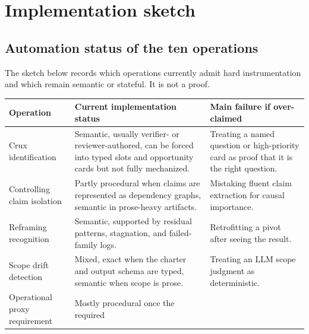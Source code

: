 \documentclass[
  11pt,
]{article}
\begin{document}
\section{Implementation sketch}\label{implementation-sketch}

\subsection{Automation status of the ten
operations}\label{automation-status-of-the-ten-operations}

The sketch below records which operations currently admit hard
instrumentation and which remain semantic or stateful. It is not a proof.

\begin{longtable}[]{@{}
  >{\raggedright\arraybackslash}p{}
  >{\raggedright\arraybackslash}p{}
  >{\raggedright\arraybackslash}p{}@{}}
\toprule\noalign{}
\begin{minipage}[b]{\linewidth}\raggedright
Operation
\end{minipage} & \begin{minipage}[b]{\linewidth}\raggedright
Current implementation status
\end{minipage} & \begin{minipage}[b]{\linewidth}\raggedright
Main failure if over-claimed
\end{minipage} \\
\midrule\noalign{}
\endhead
\bottomrule\noalign{}
\endlastfoot
Crux identification & Semantic, usually verifier- or
reviewer-authored, can be forced into typed slots and opportunity cards
but not fully mechanized. & Treating a named question or high-priority
card as proof that it is the right question. \\
Controlling claim isolation & Partly procedural when claims are
represented as dependency graphs, semantic in prose-heavy artifacts. &
Mistaking fluent claim extraction for causal importance. \\
Reframing recognition & Semantic, supported by residual
patterns, stagnation, and failed-family logs. & Retrofitting a pivot
after seeing the result. \\
Scope drift detection & Mixed, exact when the charter and output
schema are typed, semantic when scope is prose. & Treating an LLM scope
judgment as deterministic. \\
Operational proxy requirement & Mostly procedural once the required

\end{longtable}
\end{document}
